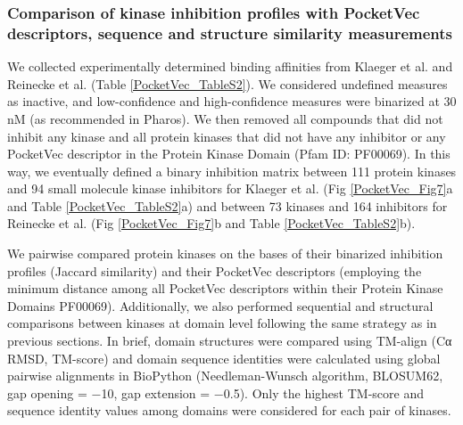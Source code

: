 \subsubsection{Comparison of kinase inhibition profiles with PocketVec descriptors, sequence and structure similarity measurements}

We collected experimentally determined binding affinities from Klaeger et al.\cite{klaeger_target_2017} and Reinecke et al.\cite{reinecke_chemical_2023} (Table \ref{PocketVec_TableS2}). We considered undefined measures as inactive, and low-confidence and high-confidence measures were binarized at 30 nM (as recommended in Pharos\cite{nguyen_pharos_2017}). We then removed all compounds that did not inhibit any kinase and all protein kinases that did not have any inhibitor or any PocketVec descriptor in the Protein Kinase Domain (Pfam ID: PF00069). In this way, we eventually defined a binary inhibition matrix between 111 protein kinases and 94 small molecule kinase inhibitors for Klaeger et al. (Fig \ref{PocketVec_Fig7}a and Table \ref{PocketVec_TableS2}a) and between 73 kinases and 164 inhibitors for Reinecke et al. (Fig \ref{PocketVec_Fig7}b and Table \ref{PocketVec_TableS2}b).

We pairwise compared protein kinases on the bases of their binarized inhibition profiles (Jaccard similarity) and their PocketVec descriptors (employing the minimum distance among all PocketVec descriptors within their Protein Kinase Domains PF00069). Additionally, we also performed sequential and structural comparisons between kinases at domain level following the same strategy as in previous sections. In brief, domain structures were compared using TM-align\cite{zhang_tm-align_2005} (Cα RMSD, TM-score) and domain sequence identities were calculated using global pairwise alignments in BioPython\cite{cock_biopython_2009} (Needleman-Wunsch algorithm, BLOSUM62, gap opening = −10, gap extension = −0.5). Only the highest TM-score and sequence identity values among domains were considered for each pair of kinases.